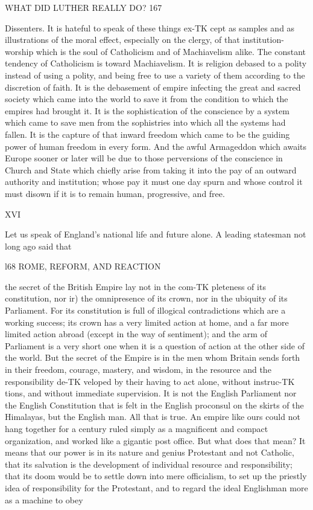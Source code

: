 \documentclass[12pt,a5paper,twoside]{book}
\begin{document}
{WHAT DID LUTHER REALLY DO? 167 

Dissenters. It is hateful to speak of these things ex-TK
cept as samples and as illustrations of the moral effect, 
especially on the clergy, of that institution-worship 
which is the soul of Catholicism and of Machiavelism 
alike. The constant tendency of Catholicism is 
toward Machiavelism. It is religion debased to a 
polity instead of using a polity, and being free to use 
a variety of them according to the discretion of faith. 
It is the debasement of empire infecting the great and 
sacred society which came into the world to save it 
from the condition to which the empires had brought it. 
It is the sophistication of the conscience by a system 
which came to save men from the sophistries into 
which all the systems had fallen. It is the capture 
of that inward freedom which came to be the guiding 
power of human freedom in every form. And the 
awful Armageddon which awaits Europe sooner or 
later will be due to those perversions of the conscience 
in Church and State which chiefly arise from taking it 
into the pay of an outward authority and institution; 
whose pay it must one day spurn and whose control 
it must disown if it is to remain human, progressive, 
and free. 

XVI 

Let us speak of England's national life and future 
alone. A leading statesman not long ago said that 



l68 ROME, REFORM, AND REACTION 

the secret of the British Empire lay not in the com-TK
pleteness of its constitution, nor ir) the omnipresence 
of its crown, nor in the ubiquity of its Parliament. 
For its constitution is full of illogical contradictions 
which are a working success; its crown has a very 
limited action at home, and a far more limited action 
abroad (except in the way of sentiment); and the 
arm of Parliament is a very short one when it is a 
question of action at the other side of the world. 
But the secret of the Empire is in the men whom 
Britain sends forth in their freedom, courage, mastery, 
and wisdom, in the resource and the responsibility de-TK
veloped by their having to act alone, without instruc-TK
tions, and without immediate supervision. It is not 
the English Parliament nor the English Constitution 
that is felt in the English proconsul on the skirts of 
the Himalayas, but the English man. All that is true. 
An empire like ours could not hang together for a 
century ruled simply as a magnificent and compact 
organization, and worked like a gigantic post office. 
But what does that mean? It means that our power 
is in its nature and genius Protestant and not Catholic, 
that its salvation is the development of individual 
resource and responsibility; that its doom would be to 
settle down into mere officialism, to set up the priestly 
idea of responsibility for the Protestant, and to regard 
the ideal Englishman more as a machine to obey 



}
\end{document}

